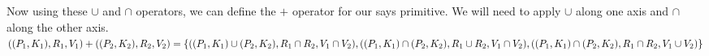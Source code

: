 Now using these $\cup$ and $\cap$ operators, we can define the $+$ operator for our says primitive. We will need to apply $\cup$ along one axis and $\cap$ along the other axis.\\
\begin{math}
((P_{1}, K_{1}), R_{1}, V_{1}) + ((P_{2}, K_{2}), R_{2}, V_{2}) = \\ \{((P_{1}, K_{1}) \cup (P_{2}, K_{2}), R_{1} \cap R_{2}, V_{1} \cap V_{2}), \\
((P_{1}, K_{1}) \cap (P_{2}, K_{2}), R_{1} \cup R_{2}, V_{1} \cap V_{2}), \\((P_{1}, K_{1}) \cap (P_{2}, K_{2}), R_{1} \cap R_{2}, V_{1} \cup V_{2})\} \\
\end{math} 




